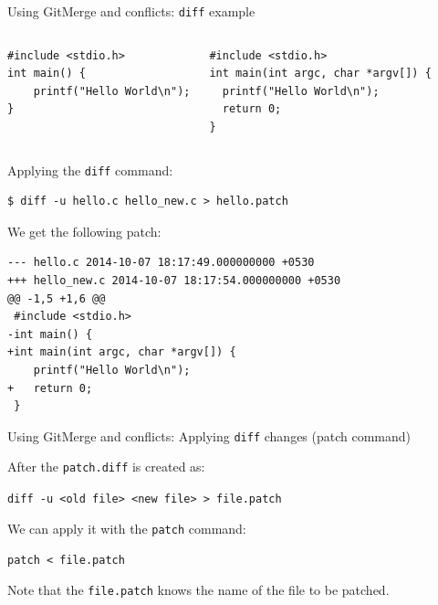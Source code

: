 \documentclass[10pt,compress]{beamer} %
\begin{document}
\begin{frame}[fragile]{Using Git}{Merge and conflicts: \texttt{diff} example}

\begin{scriptsize}
\begin{columns}
	  \begin{verbatim}
#include <stdio.h>
int main() {
    printf("Hello World\n");
}
\end{verbatim}
\begin{verbatim}
#include <stdio.h>
int main(int argc, char *argv[]) {
  printf("Hello World\n");
  return 0;
}
\end{verbatim}
\end{columns}

Applying the \texttt{diff} command:
\begin{verbatim}
$ diff -u hello.c hello_new.c > hello.patch
\end{verbatim}

We get the following patch:
\begin{verbatim}
--- hello.c	2014-10-07 18:17:49.000000000 +0530
+++ hello_new.c	2014-10-07 18:17:54.000000000 +0530
@@ -1,5 +1,6 @@
 #include <stdio.h>
-int main() {
+int main(int argc, char *argv[]) {
 	printf("Hello World\n");
+	return 0;
 }
\end{verbatim}
\end{scriptsize}


\end{frame}


\begin{frame}{Using Git}{Merge and conflicts: Applying \texttt{diff} changes (patch command)}

After the \texttt{patch.diff} is created as:

\texttt{diff -u <old file> <new file> > file.patch }

We can apply it with the \texttt{patch} command:

\texttt{patch < file.patch}

Note that the \texttt{file.patch} knows the name of the file to be patched.


\end{frame}

\end{document}
